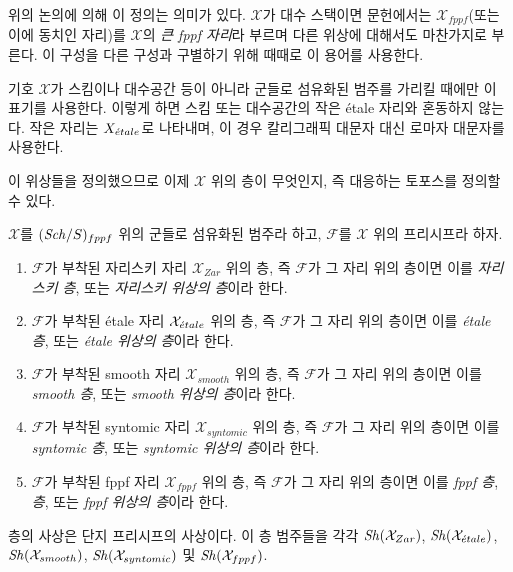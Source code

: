 \noindent
위의 논의에 의해 이 정의는 의미가 있다. $\mathcal{X}$가 대수
스택이면 문헌에서는 $\mathcal{X}_{fppf}$(또는 이에 동치인 자리)를
$\mathcal{X}$의 {\it 큰 fppf 자리}라 부르며 다른 위상에 대해서도
마찬가지로 부른다. 이 구성을 다른 구성과 구별하기 위해 때때로 이
용어를 사용한다.

\begin{remark}
\label{remark-ambiguity}
기호 $\mathcal{X}$가 스킴이나 대수공간 등이 아니라 군들로 섬유화된
범주를 가리킬 때에만 이 표기를 사용한다. 이렇게 하면 스킴 또는
대수공간의 작은 \'etale 자리와 혼동하지 않는다. 작은 자리는
$X_{\acute{e}tale}$로 나타내며, 이 경우 칼리그래픽 대문자 대신 로마자
대문자를 사용한다.
\end{remark}

\noindent
이 위상들을 정의했으므로 이제 $\mathcal{X}$ 위의 층이 무엇인지,
즉 대응하는 토포스를 정의할 수 있다.

\begin{definition}
\label{definition-sheaves}
$\mathcal{X}$를 $(\mathit{Sch}/S)_{fppf}$ 위의 군들로 섬유화된 범주라 하고,
$\mathcal{F}$를 $\mathcal{X}$ 위의 프리시프라 하자.
\begin{enumerate}
\item $\mathcal{F}$가 부착된 자리스키 자리 $\mathcal{X}_{Zar}$ 위의
층, 즉 $\mathcal{F}$가 그 자리 위의 층이면 이를 {\it 자리스키 층},
또는 {\it 자리스키 위상의 층}이라 한다.
\item $\mathcal{F}$가 부착된 \'etale 자리 $\mathcal{X}_{\acute{e}tale}$ 위의
층, 즉 $\mathcal{F}$가 그 자리 위의 층이면 이를 {\it \'etale 층},
또는 {\it \'etale 위상의 층}이라 한다.
\item $\mathcal{F}$가 부착된 smooth 자리 $\mathcal{X}_{smooth}$ 위의
층, 즉 $\mathcal{F}$가 그 자리 위의 층이면 이를 {\it smooth 층},
또는 {\it smooth 위상의 층}이라 한다.
\item $\mathcal{F}$가 부착된 syntomic 자리 $\mathcal{X}_{syntomic}$
위의 층, 즉 $\mathcal{F}$가 그 자리 위의 층이면 이를 {\it syntomic 층},
또는 {\it syntomic 위상의 층}이라 한다.
\item $\mathcal{F}$가 부착된 fppf 자리 $\mathcal{X}_{fppf}$ 위의
층, 즉 $\mathcal{F}$가 그 자리 위의 층이면 이를 {\it fppf 층},
{\it 층}, 또는 {\it fppf 위상의 층}이라 한다.
\end{enumerate}
층의 사상은 단지 프리시프의 사상이다. 이 층 범주들을 각각
$\mathop{\mathit{Sh}}\nolimits(\mathcal{X}_{Zar})$,
$\mathop{\mathit{Sh}}\nolimits(\mathcal{X}_{\acute{e}tale})$,
$\mathop{\mathit{Sh}}\nolimits(\mathcal{X}_{smooth})$,
$\mathop{\mathit{Sh}}\nolimits(\mathcal{X}_{syntomic})$ 및
$\mathop{\mathit{Sh}}\nolimits(\mathcal{X}_{fppf})$.
\end{definition}

